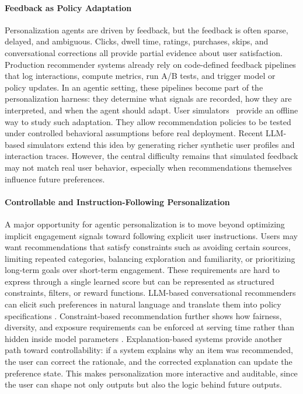 \documentclass{llmxive}
\begin{document}
\paragraph{Feedback as Policy Adaptation}
Personalization agents are driven by feedback, but the feedback is often sparse, delayed, and ambiguous. Clicks, dwell time, ratings, purchases, skips, and conversational corrections all provide partial evidence about user satisfaction. Production recommender systems already rely on code-defined feedback pipelines that log interactions, compute metrics, run A/B tests, and trigger model or policy updates. In an agentic setting, these pipelines become part of the personalization harness: they determine what signals are recorded, how they are interpreted, and when the agent should adapt.
User simulators~\citep{zhang2025llm,wang2025user,liu2025recoworld} provide an offline way to study such adaptation. They allow recommendation policies to be tested under controlled behavioral assumptions before real deployment. Recent LLM-based simulators extend this idea by generating richer synthetic user profiles and interaction traces. However, the central difficulty remains that simulated feedback may not match real user behavior, especially when recommendations themselves influence future preferences.

\paragraph{Controllable and Instruction-Following Personalization}
A major opportunity for agentic personalization is to move beyond optimizing implicit engagement signals toward following explicit user instructions. Users may want recommendations that satisfy constraints such as avoiding certain sources, limiting repeated categories, balancing exploration and familiarity, or prioritizing long-term goals over short-term engagement. These requirements are hard to express through a single learned score but can be represented as structured constraints, filters, or reward functions.
LLM-based conversational recommenders can elicit such preferences in natural language and translate them into policy specifications \citep{hou2024large}. Constraint-based recommendation further shows how fairness, diversity, and exposure requirements can be enforced at serving time rather than hidden inside model parameters \citep{lei2020conversational}. Explanation-based systems provide another path toward controllability: if a system explains why an item was recommended, the user can correct the rationale, and the corrected explanation can update the preference state. This makes personalization more interactive and auditable, since the user can shape not only outputs but also the logic behind future outputs.
\end{document}
